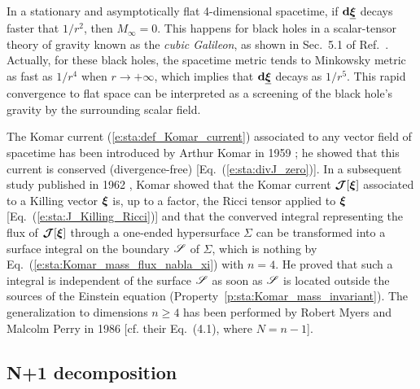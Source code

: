 \begin{example}
In a stationary and asymptotically flat 4-dimensional spacetime, if $\mathbf{d}\underline{\bm{\xi}}$
decays faster that $1/r^2$, then $M_\infty = 0$.
This happens for black holes in a scalar-tensor theory of gravity known as the \emph{cubic Galileon}, as shown in Sec.~5.1 of Ref.~\cite{VanaeGGC20}.
Actually, for these black holes, the spacetime metric tends to Minkowsky metric as fast as
$1/r^4$ when $r\to +\infty$, which implies that $\mathbf{d}\underline{\bm{\xi}}$ decays as $1/r^5$.
This rapid convergence to flat space can be interpreted as a screening of the
black hole's gravity by the surrounding scalar field.
\end{example}


\begin{hist}
The Komar current (\ref{e:sta:def_Komar_current}) associated to any vector field
of spacetime has been introduced by Arthur Komar in 1959 \cite{Komar59};
he showed that this current is conserved (divergence-free) [Eq.~(\ref{e:sta:divJ_zero})].
In a subsequent study published in  1962 \cite{Komar62}, Komar showed that
the Komar current $\bm{\mathcal{J}}[\bm{\xi}]$ associated to a Killing vector $\bm{\xi}$ is, up to a factor, the
Ricci tensor applied to $\bm{\xi}$ [Eq.~(\ref{e:sta:J_Killing_Ricci})] and that
the converved integral representing the flux of $\bm{\mathcal{J}}[\bm{\xi}]$ through a one-ended hypersurface $\Sigma$
can be transformed into a surface integral on the boundary $\mathscr{S}$ of $\Sigma$,
which is nothing by Eq.~(\ref{e:sta:Komar_mass_flux_nabla_xi}) with $n=4$.
He proved that such a integral is independent of the surface $\mathscr{S}$ as soon as
$\mathscr{S}$ is located outside the sources of the Einstein equation
(Property~\ref{p:sta:Komar_mass_invariant}). The generalization to
dimensions $n\geq 4$ has been performed by
Robert Myers and Malcolm Perry in 1986 \cite{MyersP86}
[cf. their Eq.~(4.1), where $N=n-1$].
\end{hist}

\subsection{N+1 decomposition} \label{s:sta:np1_decomp}

